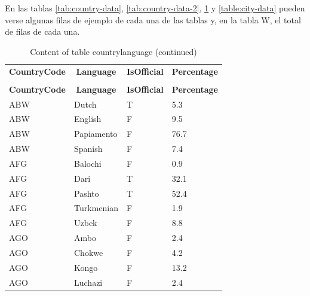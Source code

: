 
En las tablas \ref{tab:country-data}, \ref{tab:country-data-2}, \ref{table:countrylanguage-data} y \ref{table:city-data} pueden verse algunas filas de ejemplo de cada una de las tablas y, en la tabla W, el total de filas de cada una.

%
%
 \begin{longtable}{|l|l|l|l|}
 \hline \endhead \hline \endfoot \hline
 \caption{Algunas filas de la tabla CountryLanguage} \label{table:countrylanguage-data} \\\hline \multicolumn{1}{|c|}{\textbf{CountryCode}} & \multicolumn{1}{|c|}{\textbf{Language}} & \multicolumn{1}{|c|}{\textbf{IsOfficial}} & \multicolumn{1}{|c|}{\textbf{Percentage}} \\ \hline \hline  \endfirsthead
\caption{Content of table countrylanguage (continued)} \\ \hline \multicolumn{1}{|c|}{\textbf{CountryCode}} & \multicolumn{1}{|c|}{\textbf{Language}} & \multicolumn{1}{|c|}{\textbf{IsOfficial}} & \multicolumn{1}{|c|}{\textbf{Percentage}} \\ \hline \hline \endhead \endfoot
ABW & Dutch & T & 5.3 \\ \hline
ABW & English & F & 9.5 \\ \hline
ABW & Papiamento & F & 76.7 \\ \hline
ABW & Spanish & F & 7.4 \\ \hline
AFG & Balochi & F & 0.9 \\ \hline
AFG & Dari & T & 32.1 \\ \hline
AFG & Pashto & T & 52.4 \\ \hline
AFG & Turkmenian & F & 1.9 \\ \hline
AFG & Uzbek & F & 8.8 \\ \hline
AGO & Ambo & F & 2.4 \\ \hline
AGO & Chokwe & F & 4.2 \\ \hline
AGO & Kongo & F & 13.2 \\ \hline
AGO & Luchazi & F & 2.4 \\ \hline
 \end{longtable}

